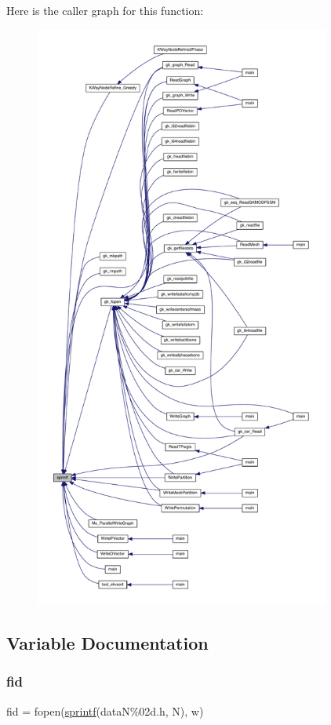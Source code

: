 Here is the caller graph for this function\+:\nopagebreak
\begin{figure}[H]
\begin{center}
\leavevmode
\includegraphics[height=550pt]{a00575_ae6aab5c308faac0fc539cc9c6da9fbd0_icgraph}
\end{center}
\end{figure}


\subsection{Variable Documentation}
\mbox{\label{a00575_ae9011d40c6f13e68e6f07156e0da7c5d}} 
\subsubsection{\texorpdfstring{fid}{fid}}
{\footnotesize\ttfamily fid = fopen(\hyperlink{a00575_ae6aab5c308faac0fc539cc9c6da9fbd0}{sprintf}(\textquotesingle{}dataN\%02d.\+h\textquotesingle{}, N), \textquotesingle{}w\textquotesingle{})}

